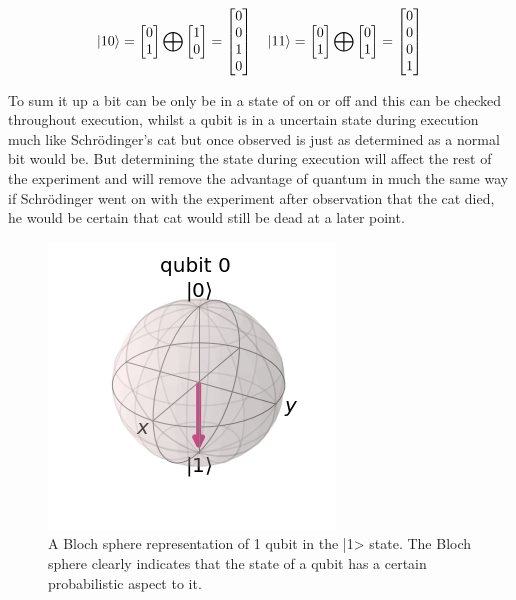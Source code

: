 \[
\ket{10}=
\begin{bmatrix}
0					\\
1
\end{bmatrix} 
\bigoplus
\begin{bmatrix}
1					\\
0
\end{bmatrix} =
\begin{bmatrix}
0					\\
0					\\
1					\\
0					\\
\end{bmatrix}
\quad
\ket{11}=
\begin{bmatrix}
0					\\
1
\end{bmatrix} 
\bigoplus
\begin{bmatrix}
0					\\
1
\end{bmatrix} =
\begin{bmatrix}
0					\\
0					\\
0					\\
1					\\
\end{bmatrix}
\]

To sum it up a bit can be only be in a state of on or off and this can be checked throughout execution, whilst a qubit is in a uncertain state during execution much like Schrödinger's cat but once observed is just as determined as a normal bit would be. But determining the state during execution will affect the rest of the experiment and will remove the advantage of quantum in much the same way if Schrödinger went on with the experiment after observation that the cat died, he would be certain that cat would still be dead at a later point.

\begin{figure}[h]
\centering
\includegraphics[scale = 0.75]{../Demonstration/img/Quantum_essentials_1.PNG}
\caption{A Bloch sphere representation of 1 qubit in the |1> state. The Bloch sphere clearly indicates that the state of a qubit has a certain probabilistic aspect to it.}
\end{figure}

